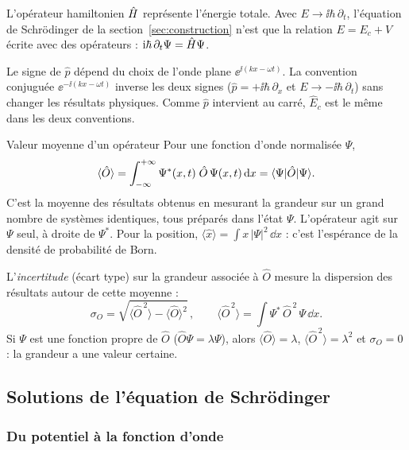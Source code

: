 L'opérateur hamiltonien $\hat{H}$ représente l'énergie totale. Avec $E\to\ii\hbar\,\partial_t$,
l'équation de Schrödinger de la section~\ref{sec:construction} n'est que la relation
$E=E_c+V$ écrite avec des opérateurs : $\mathrm{i}\hbar\,\partial_t\Psi=\hat{H}\Psi$.

\begin{remarque}
Le signe de $\hat p$ dépend du choix de l'onde plane $\ee^{\ii(kx-\omega t)}$. La
convention conjuguée $\ee^{-\ii(kx-\omega t)}$ inverse les deux signes
($\hat p=+\ii\hbar\,\partial_x$ et $E\to-\ii\hbar\,\partial_t$) sans changer les
résultats physiques. Comme $\hat p$ intervient au carré, $\hat E_c$ est le même dans
les deux conventions.
\end{remarque}

\begin{definition}{Valeur moyenne d'un opérateur}
Pour une fonction d'onde normalisée $\Psi$,
\[
  \langle\hat O\rangle
  = \int_{-\infty}^{+\infty}\Psi^*(x,t)\;\hat O\,\Psi(x,t)\,\mathrm{d} x
  = \langle \Psi|\hat O|\Psi\rangle.
\]
C'est la moyenne des résultats obtenus en mesurant la grandeur sur un grand nombre
de systèmes identiques, tous préparés dans l'état $\Psi$. L'opérateur agit sur
$\Psi$ seul, à droite de $\Psi^*$. Pour la position,
$\langle\hat x\rangle=\int x\,|\Psi|^2\,\dd x$ : c'est l'espérance de la densité
de probabilité de Born.

L'\emph{incertitude} (écart type) sur la grandeur associée à $\hat O$ mesure la
dispersion des résultats autour de cette moyenne :
\[
  \sigma_O=\sqrt{\langle\hat O^{\,2}\rangle-\langle\hat O\rangle^2}\,,
  \qquad
  \langle\hat O^{\,2}\rangle=\int\Psi^*\,\hat O^{\,2}\,\Psi\,\dd x .
\]
Si $\Psi$ est une fonction propre de $\hat O$ ($\hat O\Psi=\lambda\Psi$), alors
$\langle\hat O\rangle=\lambda$, $\langle\hat O^{\,2}\rangle=\lambda^2$ et
$\sigma_O=0$ : la grandeur a une valeur certaine.
\end{definition}

\subsection{Solutions de l'équation de Schrödinger}\label{sec:solutions}

\subsubsection{Du potentiel à la fonction d'onde}

